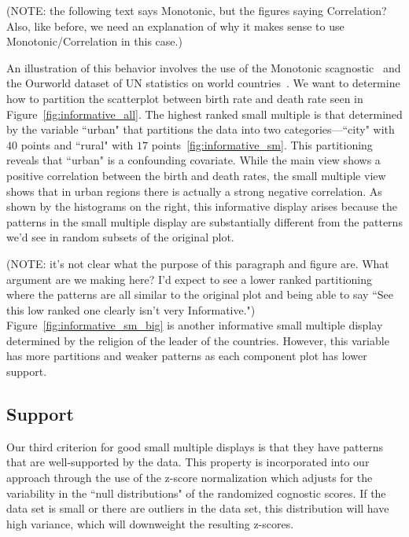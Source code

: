 (NOTE: the following text says Monotonic, but the figures saying Correlation? Also, like before, we need an explanation of why it makes sense to use Monotonic/Correlation in this case.)

An illustration of this behavior involves the use of the Monotonic scagnostic~\cite{Wilkinson2005} and the Ourworld dataset of UN statistics on world countries~\cite{Wilkinson2005GG}. We want to determine how to partition the scatterplot between birth rate and death rate seen in Figure~\ref{fig:informative_all}. The highest ranked small multiple is that determined by the variable ``urban" that partitions the data into two categories---``city" with $40$ points and ``rural" with $17$ points~\ref{fig:informative_sm}. This partitioning reveals that ``urban" is a confounding covariate. While the main view shows a positive correlation between the birth and death rates, the small multiple view shows that in urban regions there is actually a strong negative correlation. As shown by the histograms on the right, this informative display arises because the patterns in the small multiple display are substantially different from the patterns we'd see in random subsets of the original plot.


(NOTE: it's not clear what the purpose of this paragraph and figure are. What argument are we making here? I'd expect to see a lower ranked partitioning where the patterns are all similar to the original plot and being able to say ``See this low ranked one clearly isn't very Informative.")
Figure~\ref{fig:informative_sm_big} is another informative small multiple display determined by the religion of the leader of the countries. However, this variable has more partitions and weaker patterns as each component plot has lower support. 


\subsection{Support}
Our third criterion for good small multiple displays is that they have patterns that are well-supported by the data. This property is incorporated into our approach through the use of the z-score normalization which adjusts for the variability in the ``null distributions" of the randomized cognostic scores. If the data set is small or there are outliers in the data set, this distribution will have high variance, which will downweight the resulting z-scores.

